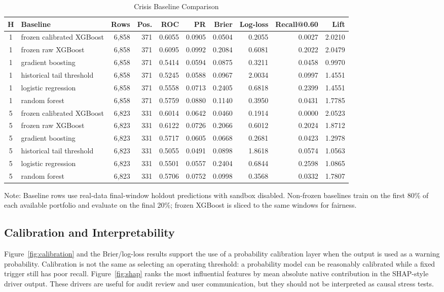 \documentclass{ieeeaccess}
\newcommand{\tabnote}[1]{\vspace{2pt}\begin{flushleft}\footnotesize Note: #1\end{flushleft}}
\begin{document}
\begin{table}[t]
\caption{Crisis Baseline Comparison}
\label{tab:baseline}
\centering
\scriptsize
\begin{tabularx}{\textwidth}{c Y r r r r r r r r}
\toprule
H & Baseline & Rows & Pos. & ROC & PR & Brier & Log-loss & Recall@0.60 & Lift \\
 & frozen calibrated XGBoost & 6,858 & 371 & 0.6055 & 0.0905 & 0.0504 & 0.2055 & 0.0027 & 2.0210 \\
1 & frozen raw XGBoost & 6,858 & 371 & 0.6095 & 0.0992 & 0.2084 & 0.6081 & 0.2022 & 2.0479 \\
1 & gradient boosting & 6,858 & 371 & 0.5414 & 0.0594 & 0.0875 & 0.3211 & 0.0458 & 0.9970 \\
1 & historical tail threshold & 6,858 & 371 & 0.5245 & 0.0588 & 0.0967 & 2.0034 & 0.0997 & 1.4551 \\
1 & logistic regression & 6,858 & 371 & 0.5558 & 0.0713 & 0.2405 & 0.6818 & 0.2399 & 1.4551 \\
1 & random forest & 6,858 & 371 & 0.5759 & 0.0880 & 0.1140 & 0.3950 & 0.0431 & 1.7785 \\
5 & frozen calibrated XGBoost & 6,823 & 331 & 0.6014 & 0.0642 & 0.0460 & 0.1914 & 0.0000 & 2.0523 \\
5 & frozen raw XGBoost & 6,823 & 331 & 0.6122 & 0.0726 & 0.2066 & 0.6012 & 0.2024 & 1.8712 \\
5 & gradient boosting & 6,823 & 331 & 0.5717 & 0.0605 & 0.0668 & 0.2681 & 0.0423 & 1.2978 \\
5 & historical tail threshold & 6,823 & 331 & 0.5055 & 0.0491 & 0.0898 & 1.8618 & 0.0574 & 1.0563 \\
5 & logistic regression & 6,823 & 331 & 0.5501 & 0.0557 & 0.2404 & 0.6844 & 0.2598 & 1.0865 \\
5 & random forest & 6,823 & 331 & 0.5706 & 0.0752 & 0.0998 & 0.3568 & 0.0332 & 1.7807 \\
\bottomrule
\end{tabularx}
\tabnote{Baseline rows use real-data final-window holdout predictions with sandbox disabled. Non-frozen baselines train on the first 80\% of each available portfolio and evaluate on the final 20\%; frozen XGBoost is sliced to the same windows for fairness.}
\end{table}

\subsection{Calibration and Interpretability}
Figure~\ref{fig:calibration} and the Brier/log-loss results support the use of a probability calibration layer when the output is used as a warning probability. Calibration is not the same as selecting an operating threshold: a probability model can be reasonably calibrated while a fixed trigger still has poor recall. Figure~\ref{fig:shap} ranks the most influential features by mean absolute native contribution in the SHAP-style driver output. These drivers are useful for audit review and user communication, but they should not be interpreted as causal stress tests.
\end{document}
